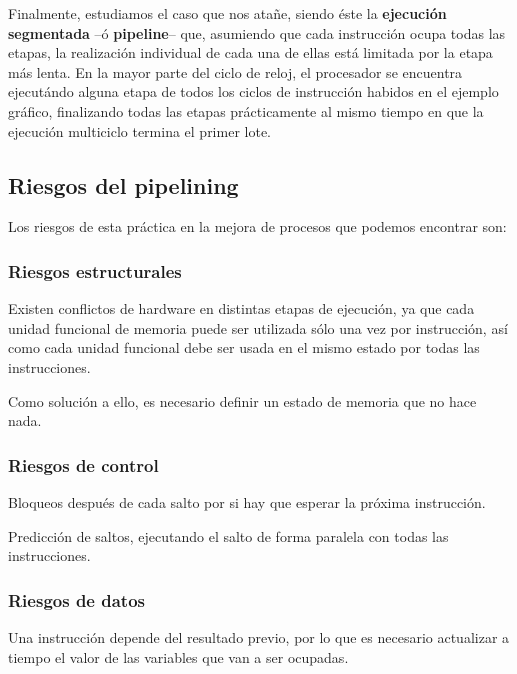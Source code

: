 \documentclass[a4paper, 11pt, titlepage]{article}
\begin{document}
    Finalmente, estudiamos el caso que nos atañe, siendo éste la \textbf{ejecución segmentada} --ó \textbf{pipeline}-- que, asumiendo 
    que cada instrucción ocupa todas las etapas, la realización individual de cada una de ellas está limitada por la etapa más lenta. 
    En la mayor parte del ciclo de reloj, el procesador se encuentra ejecutándo alguna etapa de todos los ciclos de instrucción habidos 
    en el ejemplo gráfico, finalizando todas las etapas prácticamente al mismo tiempo en que la ejecución multiciclo termina el primer 
    lote.

    \subsection{Riesgos del pipelining}

        Los riesgos de esta práctica en la mejora de procesos que podemos encontrar son:

        \subsubsection{Riesgos estructurales}

            Existen conflictos de hardware en distintas etapas de ejecución, ya que cada unidad funcional de memoria puede ser utilizada sólo 
            una vez por instrucción, así como cada unidad funcional debe ser usada en el mismo estado por todas las instrucciones.

            Como solución a ello, es necesario definir un estado de memoria que no hace nada.

        \subsubsection{Riesgos de control}

            Bloqueos después de cada salto por si hay que esperar la próxima instrucción.
            
            Predicción de saltos, ejecutando el salto de forma paralela con todas las instrucciones.

        \subsubsection{Riesgos de datos}

            Una instrucción depende del resultado previo, por lo que es necesario actualizar a tiempo el valor de las variables que van a ser 
            ocupadas.
\end{document}
